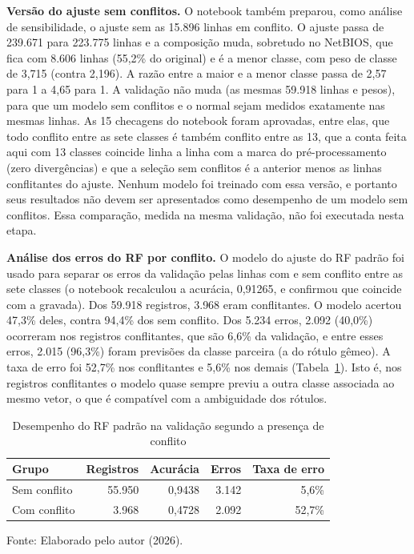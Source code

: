 \documentclass[
    12pt,                %
    openright,           %
    oneside,             %
    a4paper,             %
    english,             %
    brazil               %
]{abntex2}
\begin{document}
\textbf{Versão do ajuste sem conflitos.} O notebook também preparou, como análise de sensibilidade, o ajuste sem as 15.896 linhas em conflito. O ajuste passa de 239.671 para 223.775 linhas e a composição muda, sobretudo no NetBIOS, que fica com 8.606 linhas (55,2\% do original) e é a menor classe, com peso de classe de 3,715 (contra 2,196). A razão entre a maior e a menor classe passa de 2,57 para 1 a 4,65 para 1. A validação não muda (as mesmas 59.918 linhas e pesos), para que um modelo sem conflitos e o normal sejam medidos exatamente nas mesmas linhas. As 15 checagens do notebook foram aprovadas, entre elas, que todo conflito entre as sete classes é também conflito entre as 13, que a conta feita aqui com 13 classes coincide linha a linha com a marca do pré-processamento (zero divergências) e que a seleção sem conflitos é a anterior menos as linhas conflitantes do ajuste. Nenhum modelo foi treinado com essa versão, e portanto seus resultados não devem ser apresentados como desempenho de um modelo sem conflitos. Essa comparação, medida na mesma validação, não foi executada nesta etapa.
 
\textbf{Análise dos erros do RF por conflito.} O modelo do ajuste do RF padrão foi usado para separar os erros da validação pelas linhas com e sem conflito entre as sete classes (o notebook recalculou a acurácia, 0,91265, e confirmou que coincide com a gravada). Dos 59.918 registros, 3.968 eram conflitantes. O modelo acertou 47,3\% deles, contra 94,4\% dos sem conflito. Dos 5.234 erros, 2.092 (40,0\%) ocorreram nos registros conflitantes, que são 6,6\% da validação, e entre esses erros, 2.015 (96,3\%) foram previsões da classe parceira (a do rótulo gêmeo). A taxa de erro foi 52,7\% nos conflitantes e 5,6\% nos demais (Tabela~\ref{tab:erros-conflito}). Isto é, nos registros conflitantes o modelo quase sempre previu a outra classe associada ao mesmo vetor, o que é compatível com a ambiguidade dos rótulos.
 
\begin{table}
\centering
\caption{Desempenho do RF padrão na validação segundo a presença de conflito}
\label{tab:erros-conflito}
\begin{tabular}{lrrrr}
\hline
Grupo & Registros & Acurácia & Erros & Taxa de erro \\
\hline
Sem conflito & 55.950 & 0,9438 & 3.142 & 5,6\% \\
Com conflito & 3.968  & 0,4728 & 2.092 & 52,7\% \\
\hline
\end{tabular}
\par\smallskip
Fonte: Elaborado pelo autor (2026).
\end{table}
 
\end{document}
